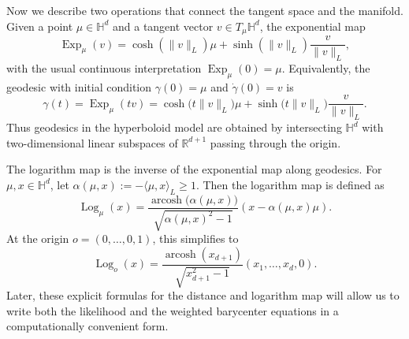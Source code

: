 \documentclass[11pt]{article}
\begin{document}
Now we describe two operations that connect the tangent space and the manifold. Given a point  \(\mu\in\mathbb{H}^d\) and a tangent vector \(v\in T_\mu\mathbb{H}^d\), the exponential map 
\begin{equation}\label{eq:bg_exp}
\operatorname{Exp}_\mu(v)
=
\cosh(\|v\|_L)\mu
+
\sinh(\|v\|_L)\frac{v}{\|v\|_L},
\end{equation}
with the usual continuous interpretation \(\operatorname{Exp}_\mu(0)=\mu\). Equivalently, the geodesic with initial condition \(\gamma(0)=\mu\) and \(\dot{\gamma}(0)=v\) is
\begin{equation}\label{eq:bg_geodesic}
\gamma(t)=\operatorname{Exp}_\mu(tv)
=
\cosh\!\bigl(t\|v\|_L\bigr)\mu
+
\sinh\!\bigl(t\|v\|_L\bigr)\frac{v}{\|v\|_L}.
\end{equation}
Thus geodesics in the hyperboloid model are obtained by intersecting \(\mathbb{H}^d\) with two-dimensional linear subspaces of \(\mathbb{R}^{d+1}\) passing through the origin.

The logarithm map is the inverse of the exponential map along geodesics. For \(\mu,x\in\mathbb{H}^d\), let
$\alpha(\mu,x):=-\langle \mu,x\rangle_L\ge 1$. Then the logarithm map is defined as 
\begin{equation}\label{eq:bg_log}
\operatorname{Log}_\mu(x)
=
\frac{\operatorname{arcosh}\bigl(\alpha(\mu,x)\bigr)}{\sqrt{\alpha(\mu,x)^2-1}}
\left(x-\alpha(\mu,x)\mu\right).
\end{equation}
At the origin \(o=(0,\ldots,0,1)\), this simplifies to
\begin{equation}\label{eq:bg_log_origin}
\operatorname{Log}_o(x)
=
\frac{\operatorname{arcosh}(x_{d+1})}{\sqrt{x_{d+1}^2-1}}
(x_1,\ldots,x_d,0).
\end{equation}
Later, these explicit formulas for the distance and logarithm map will allow us to write both the likelihood and the weighted barycenter equations in a computationally convenient form.
\end{document}
